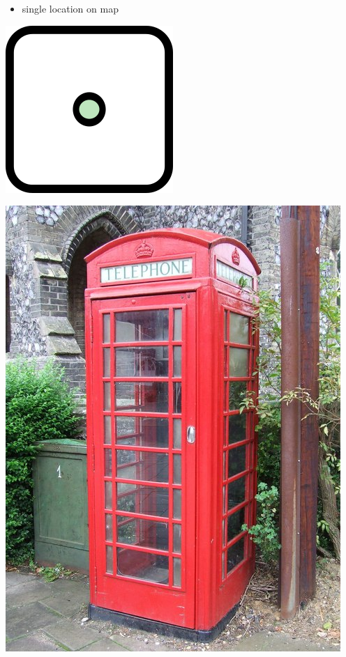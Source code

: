 \documentclass{beamer}
\begin{document}
	\begin{frame}
		\begin{itemize}
			\item single location on map
		\end{itemize}
		
		\vfill
		
		\begin{center}
			\begin{minipage}[b][0.6\textheight][c]{0.2\linewidth}
				\centering
				\includegraphics[width=0.5\linewidth,height=0.5\textheight,keepaspectratio]{images/240px-Mf_node.png}
			\end{minipage}
			\begin{minipage}[b][0.6\textheight][c]{0.4\linewidth}
				\centering
				\includegraphics[width=0.8\linewidth,height=0.8\textheight,keepaspectratio]{images/red-telephone-box-uk.jpg}

\end{minipage}
\end{center}
\end{frame}
\end{document}
